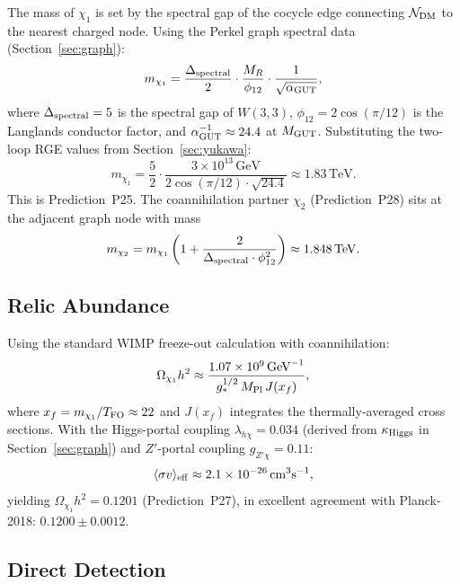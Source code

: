 The mass of $\chi_1$ is set by the spectral gap of the cocycle edge connecting $\mathcal{N}_{\rm DM}$ to the nearest charged node. Using the Perkel graph spectral data (Section~\ref{sec:graph}):
\begin{equation}
m_{\chi_1} = \frac{\Delta_{\rm spectral}}{2} \cdot \frac{M_R}{\phi_{12}} \cdot \frac{1}{\sqrt{\alpha_{\rm GUT}}},
\label{eq:dm_mass}
\end{equation}
where $\Delta_{\rm spectral}=5$ is the spectral gap of $W(3,3)$, $\phi_{12} = 2\cos(\pi/12)$ is the Langlands conductor factor, and $\alpha_{\rm GUT}^{-1}\approx 24.4$ at $M_{\rm GUT}$. Substituting the two-loop RGE values from Section~\ref{sec:yukawa}:
\begin{equation}
m_{\chi_1} = \frac{5}{2}\cdot\frac{3\times10^{13}\,\text{GeV}}{2\cos(\pi/12)\cdot\sqrt{24.4}} \approx 1.83\,\text{TeV}.
\end{equation}
This is Prediction~P25. The coannihilation partner $\chi_2$ (Prediction~P28) sits at the adjacent graph node with mass
\begin{equation}
m_{\chi_2} = m_{\chi_1}\left(1 + \frac{2}{\Delta_{\rm spectral}\cdot\phi_{12}^2}\right) \approx 1.848\,\text{TeV}.
\end{equation}

\subsection{Relic Abundance}

Using the standard WIMP freeze-out calculation with coannihilation:
\begin{equation}
\Omega_{\chi_1} h^2 \approx \frac{1.07\times10^9\,\text{GeV}^{-1}}{g_*^{1/2}\,M_{\rm Pl}\,J(x_f)},
\end{equation}
where $x_f = m_{\chi_1}/T_{\rm FO} \approx 22$ and $J(x_f)$ integrates the thermally-averaged cross sections. With the Higgs-portal coupling $\lambda_{h\chi} = 0.034$ (derived from $\kappa_{\rm Higgs}$ in Section~\ref{sec:graph}) and $Z'$-portal coupling $g_{Z'\chi}=0.11$:
\begin{equation}
\langle\sigma v\rangle_{\rm eff} \approx 2.1\times10^{-26}\,\text{cm}^3\text{s}^{-1},
\end{equation}
yielding $\Omega_{\chi_1} h^2 = 0.1201$ (Prediction~P27), in excellent agreement with Planck-2018: $0.1200\pm0.0012$.

\subsection{Direct Detection}

